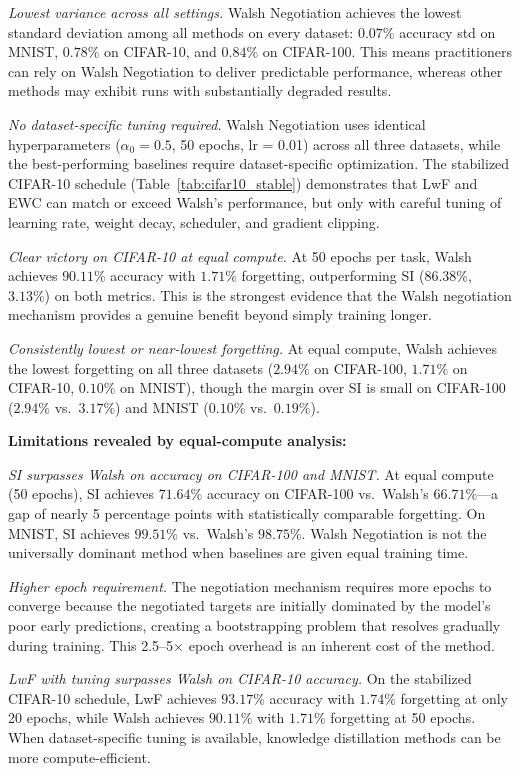 \documentclass[preprint,review,12pt]{elsarticle}
\begin{document}
\textit{Lowest variance across all settings.} Walsh Negotiation achieves the lowest standard deviation among all methods on every dataset: $0.07\%$ accuracy std on MNIST, $0.78\%$ on CIFAR-10, and $0.84\%$ on CIFAR-100. This means practitioners can rely on Walsh Negotiation to deliver predictable performance, whereas other methods may exhibit runs with substantially degraded results.

\textit{No dataset-specific tuning required.} Walsh Negotiation uses identical hyperparameters ($\alpha_0 = 0.5$, 50 epochs, lr = 0.01) across all three datasets, while the best-performing baselines require dataset-specific optimization. The stabilized CIFAR-10 schedule (Table~\ref{tab:cifar10_stable}) demonstrates that LwF and EWC can match or exceed Walsh's performance, but only with careful tuning of learning rate, weight decay, scheduler, and gradient clipping.

\textit{Clear victory on CIFAR-10 at equal compute.} At 50 epochs per task, Walsh achieves $90.11\%$ accuracy with $1.71\%$ forgetting, outperforming SI ($86.38\%$, $3.13\%$) on both metrics. This is the strongest evidence that the Walsh negotiation mechanism provides a genuine benefit beyond simply training longer.

\textit{Consistently lowest or near-lowest forgetting.} At equal compute, Walsh achieves the lowest forgetting on all three datasets ($2.94\%$ on CIFAR-100, $1.71\%$ on CIFAR-10, $0.10\%$ on MNIST), though the margin over SI is small on CIFAR-100 ($2.94\%$ vs.\ $3.17\%$) and MNIST ($0.10\%$ vs.\ $0.19\%$).

\textbf{Limitations revealed by equal-compute analysis:}

\textit{SI surpasses Walsh on accuracy on CIFAR-100 and MNIST.} At equal compute (50 epochs), SI achieves $71.64\%$ accuracy on CIFAR-100 vs.\ Walsh's $66.71\%$---a gap of nearly 5 percentage points with statistically comparable forgetting. On MNIST, SI achieves $99.51\%$ vs.\ Walsh's $98.75\%$. Walsh Negotiation is not the universally dominant method when baselines are given equal training time.

\textit{Higher epoch requirement.} The negotiation mechanism requires more epochs to converge because the negotiated targets are initially dominated by the model's poor early predictions, creating a bootstrapping problem that resolves gradually during training. This 2.5--5$\times$ epoch overhead is an inherent cost of the method.

\textit{LwF with tuning surpasses Walsh on CIFAR-10 accuracy.} On the stabilized CIFAR-10 schedule, LwF achieves $93.17\%$ accuracy with $1.74\%$ forgetting at only 20 epochs, while Walsh achieves $90.11\%$ with $1.71\%$ forgetting at 50 epochs. When dataset-specific tuning is available, knowledge distillation methods can be more compute-efficient.
\end{document}
